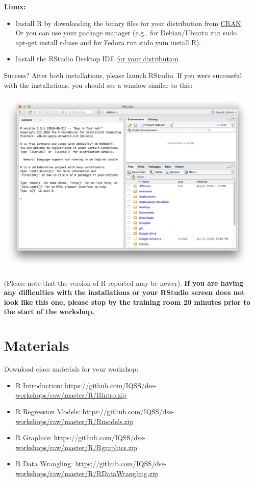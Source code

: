 \documentclass[
]{book}
\providecommand{\tightlist}{%
  \setlength{\itemsep}{0pt}\setlength{\parskip}{0pt}}
\begin{document}
\textbf{Linux:}

\begin{itemize}
\tightlist
\item
  Install R by downloading the binary files for your distribution from \href{http://cran.r-project.org/index.html}{CRAN}. Or you can use your package manager (e.g., for Debian/Ubuntu run sudo apt-get install r-base and for Fedora run sudo yum install R).
\item
  Install the RStudio Desktop IDE \href{https://rstudio.com/products/rstudio/download/\#download}{for your distribution}.
\end{itemize}

Success? After both installations, please launch RStudio. If you were successful with the installations, you should see a window similar to this:

\includegraphics{R/Rinstall/images/rstudio_successful_install.png}

(Please note that the version of R reported may be newer). \textbf{If you are having any difficulties with the installations or your RStudio screen does not look like this one, please stop by the training room 20 minutes prior to the start of the workshop.}

\hypertarget{materials}{%
\section{Materials}\label{materials}}

Download class materials for your workshop:

\begin{itemize}
\tightlist
\item
  R Introduction: \url{https://github.com/IQSS/dss-workshops/raw/master/R/Rintro.zip}
\item
  R Regression Models: \url{https://github.com/IQSS/dss-workshops/raw/master/R/Rmodels.zip}
\item
  R Graphics: \url{https://github.com/IQSS/dss-workshops/raw/master/R/Rgraphics.zip}
\item
  R Data Wrangling: \url{https://github.com/IQSS/dss-workshops/raw/master/R/RDataWrangling.zip}
\end{itemize}
\end{document}
